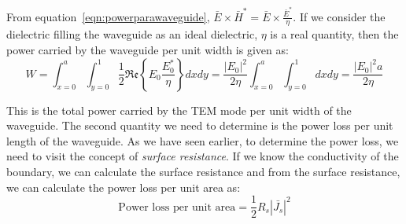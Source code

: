 From equation~\eqref{eqn:powerparawaveguide}, $\bar{E} \times \bar{H}^\ast = \bar{E} \times \frac{\bar{E}^\ast}{\eta}$. If we consider the dielectric filling the waveguide as an ideal dielectric, $\eta$ is a real quantity, then the power carried by the waveguide per unit width is given as:
\begin{dmath}
W = \int_{x=0}^{a}\int_{y=0}^{1}\frac{1}{2}\mathfrak{Re}\left\lbrace E_0 \frac{E_0^\ast}{\eta}\right\rbrace dxdy
= \frac{\left|E_{0}\right|^2}{2\eta}\int_{x=0}^{a}\int_{y=0}^{1}dxdy 
= \frac{|E_0|^2a}{2\eta}
\label{eqn:powercarriedperunitwidth}
\end{dmath}

This is the total power carried by the TEM mode per unit width of the waveguide. The second quantity we need to determine is the power loss per unit length of the waveguide. As we have seen earlier, to determine the power loss, we need to visit the concept of \emph{surface resistance}. If we know the conductivity of the boundary, we can calculate the surface resistance and from the surface resistance, we can calculate the power loss per unit area as:
\begin{equation}
\text{Power loss per unit area} = \frac{1}{2}R_s|\bar{J_s}|^2 
\end{equation}


